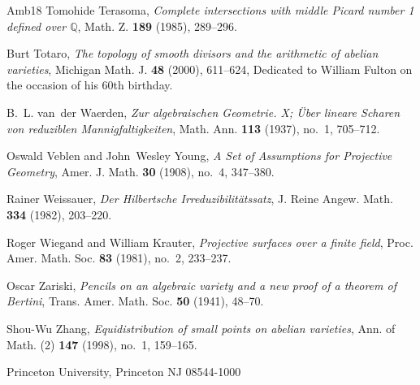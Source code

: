 \documentclass{amsart}
\theoremstyle{definition}
\theoremstyle{remark}
\begin{document}
\begin{thebibliography}{{Amb}18}
Tomohide Terasoma, \emph{Complete intersections with middle {P}icard number 1
  defined over {$\mathbb Q$}}, Math. Z. \textbf{189} (1985), 289--296.

Burt Totaro, \emph{The topology of smooth divisors and the arithmetic of
  abelian varieties}, Michigan Math. J. \textbf{48} (2000), 611--624, Dedicated
  to William Fulton on the occasion of his 60th birthday. 

B.~L. van~der Waerden, \emph{Zur algebraischen {G}eometrie. {X}; \"{U}ber
  lineare {S}charen von reduziblen {M}annigfaltigkeiten}, Math. Ann.
  \textbf{113} (1937), no.~1, 705--712. 

Oswald Veblen and John~Wesley Young, \emph{A {S}et of {A}ssumptions for
  {P}rojective {G}eometry}, Amer. J. Math. \textbf{30} (1908), no.~4, 347--380.

Rainer Weissauer, \emph{Der {H}ilbertsche {I}rreduzibilit\"{a}tssatz}, J. Reine
  Angew. Math. \textbf{334} (1982), 203--220. 

Roger Wiegand and William Krauter, \emph{Projective surfaces over a finite
  field}, Proc. Amer. Math. Soc. \textbf{83} (1981), no.~2, 233--237.

Oscar Zariski, \emph{Pencils on an algebraic variety and a new proof of a
  theorem of {B}ertini}, Trans. Amer. Math. Soc. \textbf{50} (1941), 48--70.

Shou-Wu Zhang, \emph{Equidistribution of small points on abelian varieties},
  Ann. of Math. (2) \textbf{147} (1998), no.~1, 159--165. 

\end{thebibliography}


\bigskip


  Princeton University, Princeton NJ 08544-1000


\end{document}
